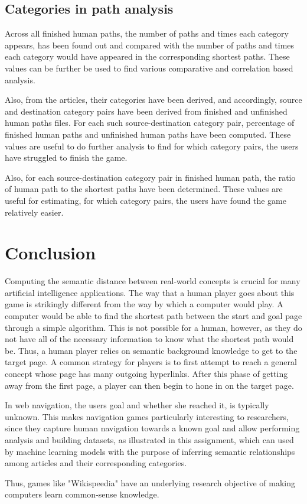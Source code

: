 \documentclass[a4paper,11pt]{article}
\begin{document}
\subsection{Categories in path analysis}

Across all  finished human paths, the number of paths and times each category appears, has been found out and compared with the number of paths and times each category would have appeared in the corresponding shortest paths. These values can be further be used to find various comparative and correlation based analysis.

Also, from the articles, their categories have been derived, and accordingly, source and destination category pairs have been derived from finished and unfinished human paths files. For each such source-destination category pair, percentage of finished human paths and unfinished human paths have been computed. These values are useful to do further analysis to find for which category pairs, the users have struggled to finish the game.

Also, for each source-destination category pair in finished human path, the ratio of human path to the shortest paths have been determined. These values are useful for estimating, for which category pairs, the users have found the game relatively easier.



\section{Conclusion}

Computing the semantic distance between real-world concepts is crucial for many artificial intelligence applications. The way that a human player goes about this game is strikingly different from the way by which a computer would play. A computer would be able to find the shortest path between the start and goal page through a simple algorithm. This is not possible for a human, however, as they do not have all of the necessary information to know what the shortest path would be. Thus, a human player relies on semantic background knowledge to get to the target page. A common strategy for players is to first attempt to reach a general concept whose page has many outgoing hyperlinks. After this phase of getting away from the first page, a player can then begin to hone in on the target page. 

In web navigation, the users goal and whether she reached it, is typically unknown. This makes navigation games particularly interesting to researchers, since they capture human navigation towards a known goal and allow performing analysis and building datasets, as illustrated in this assignment, which can used by machine learning models with the purpose of inferring semantic relationships among articles and their corresponding categories.

Thus, games like "Wikispeedia" have an underlying research objective of making computers learn common-sense knowledge.


\printbibliography
\end{document}
